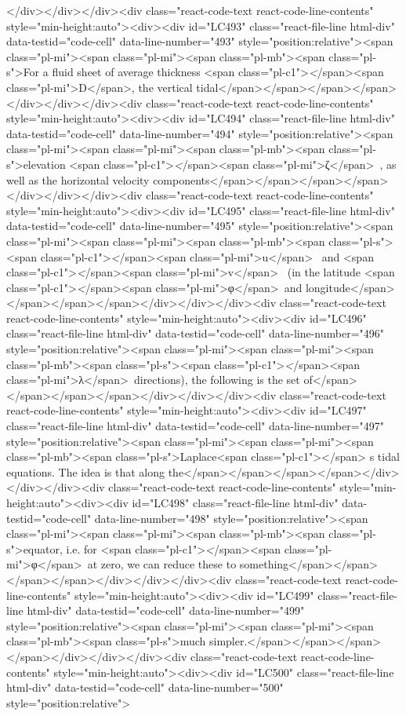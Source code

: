 {{{{{{{{</div></div></div><div class="react-code-text react-code-line-contents" style="min-height:auto"><div><div id="LC493" class="react-file-line html-div" data-testid="code-cell" data-line-number="493" style="position:relative"><span class="pl-mi"><span class="pl-mi"><span class="pl-mb"><span class="pl-s">For a fluid sheet of average thickness <span class="pl-c1">\emph</span>{<span class="pl-mi">D</span>}, the vertical tidal</span></span></span></span></div></div></div><div class="react-code-text react-code-line-contents" style="min-height:auto"><div><div id="LC494" class="react-file-line html-div" data-testid="code-cell" data-line-number="494" style="position:relative"><span class="pl-mi"><span class="pl-mi"><span class="pl-mb"><span class="pl-s">elevation <span class="pl-c1">\emph</span>{<span class="pl-mi">ζ</span>}~, as well as the horizontal velocity components</span></span></span></span></div></div></div><div class="react-code-text react-code-line-contents" style="min-height:auto"><div><div id="LC495" class="react-file-line html-div" data-testid="code-cell" data-line-number="495" style="position:relative"><span class="pl-mi"><span class="pl-mi"><span class="pl-mb"><span class="pl-s"><span class="pl-c1">\emph</span>{<span class="pl-mi">u</span>}~ and <span class="pl-c1">\emph</span>{<span class="pl-mi">v</span>}~ (in the latitude <span class="pl-c1">\emph</span>{<span class="pl-mi">φ</span>}~and longitude</span></span></span></span></div></div></div><div class="react-code-text react-code-line-contents" style="min-height:auto"><div><div id="LC496" class="react-file-line html-div" data-testid="code-cell" data-line-number="496" style="position:relative"><span class="pl-mi"><span class="pl-mi"><span class="pl-mb"><span class="pl-s"><span class="pl-c1">\emph</span>{<span class="pl-mi">λ</span>}~directions), the following is the set of</span></span></span></span></div></div></div><div class="react-code-text react-code-line-contents" style="min-height:auto"><div><div id="LC497" class="react-file-line html-div" data-testid="code-cell" data-line-number="497" style="position:relative"><span class="pl-mi"><span class="pl-mi"><span class="pl-mb"><span class="pl-s">Laplace<span class="pl-c1">\textquotesingle</span> s tidal equations. The idea is that along the</span></span></span></span></div></div></div><div class="react-code-text react-code-line-contents" style="min-height:auto"><div><div id="LC498" class="react-file-line html-div" data-testid="code-cell" data-line-number="498" style="position:relative"><span class="pl-mi"><span class="pl-mi"><span class="pl-mb"><span class="pl-s">equator, i.e. for <span class="pl-c1">\emph</span>{<span class="pl-mi">φ</span>}~at zero, we can reduce these to something</span></span></span></span></div></div></div><div class="react-code-text react-code-line-contents" style="min-height:auto"><div><div id="LC499" class="react-file-line html-div" data-testid="code-cell" data-line-number="499" style="position:relative"><span class="pl-mi"><span class="pl-mi"><span class="pl-mb"><span class="pl-s">much simpler.</span></span></span></span></div></div></div><div class="react-code-text react-code-line-contents" style="min-height:auto"><div><div id="LC500" class="react-file-line html-div" data-testid="code-cell" data-line-number="500" style="position:relative">
}}}}}}}}
